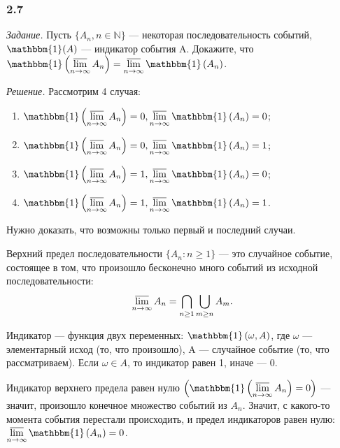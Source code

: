 \documentclass{book}
\begin{document}
\subsubsection*{2.7}

\textit{Задание.} Пусть $ \{ A_n, n \in \mathbb{N} \} $ --- некоторая последовательность событий, $ \mathbbm{1} ( A ) $ --- индикатор события A.
Докажите, что $ \mathbbm{ 1 } \left( \varlimsup \limits_{ n \to \infty } A_n \right) =
\varlimsup \limits_{ n \to \infty } \mathbbm{ 1 } \left( A_n \right) $.

\textit{Решение.} Рассмотрим 4 случая: 

\begin{enumerate}
\item $ \mathbbm{ 1 } \left( \varlimsup \limits_{ n \to \infty } A_n \right) = 0,
\varlimsup \limits_{ n \to \infty } \mathbbm{ 1 } \left( A_n \right) = 0 $;
\item $ \mathbbm{ 1 } \left( \varlimsup \limits_{ n \to \infty } A_n \right) = 0,
\varlimsup \limits_{ n \to \infty } \mathbbm{ 1 } \left( A_n \right) = 1 $;
\item $ \mathbbm{ 1 } \left( \varlimsup \limits_{ n \to \infty } A_n \right) = 1,
\varlimsup \limits_{ n \to \infty } \mathbbm{ 1 } \left( A_n \right) = 0 $;
\item $ \mathbbm{ 1 } \left( \varlimsup \limits_{ n \to \infty } A_n \right) = 1,
\varlimsup \limits_{ n \to \infty } \mathbbm{ 1 } \left( A_n \right) = 1 $.
\end{enumerate}

Нужно доказать, что возможны только первый и последний случаи.

Верхний предел последовательности
$ \{ A_n : n \geq 1 \} $ --- это случайное событие, состоящее в том, что произошло бесконечно много событий из исходной последовательности:
$$ \varlimsup \limits_{ n \to \infty } A_n =
\bigcap \limits_{ n \geq 1} \bigcup \limits_{ m \geq n} A_m.$$

Индикатор --- функция двух переменных:
$ \mathbbm{1} \left( \omega, A \right) $,
где $\omega$ --- элементарный исход (то, что произошло), A --- случайное событие (то, что рассматриваем).
Если $\omega \in A$, то индикатор равен 1, иначе --- 0.

Индикатор верхнего предела равен нулю
$ \left( \mathbbm{ 1 } \left( \varlimsup \limits_{ n \to \infty } A_n \right) = 0 \right)$ --- значит, произошло конечное множество событий из $A_n$.
Значит, с какого-то момента события перестали происходить, и предел индикаторов равен нулю: $ \varlimsup \limits_{ n \to \infty } \mathbbm{ 1 } \left( A_n \right) = 0$.
\end{document}
